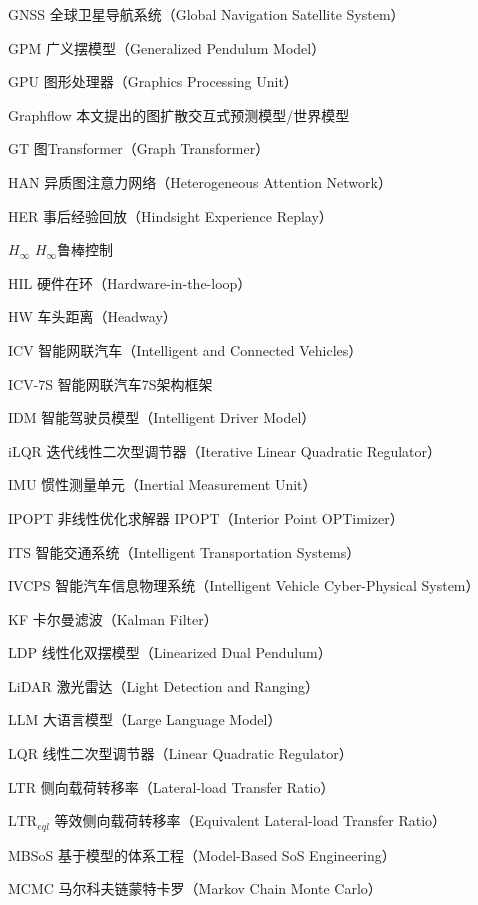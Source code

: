 \begin{denotation}[3cm]
  \item[GNSS] 全球卫星导航系统（Global Navigation Satellite System）
  \item[GPM] 广义摆模型（Generalized Pendulum Model）
  \item[GPU] 图形处理器（Graphics Processing Unit）
  \item[Graphflow] 本文提出的图扩散交互式预测模型/世界模型
  \item[GT] 图Transformer（Graph Transformer）
  \item[HAN] 异质图注意力网络（Heterogeneous Attention Network）
  \item[HER] 事后经验回放（Hindsight Experience Replay）
  \item[{$H_\infty$}] $H_\infty$鲁棒控制
  \item[HIL] 硬件在环（Hardware-in-the-loop）
  \item[HW] 车头距离（Headway）
  \item[ICV] 智能网联汽车（Intelligent and Connected Vehicles）
  \item[ICV-7S] 智能网联汽车7S架构框架
  \item[IDM] 智能驾驶员模型（Intelligent Driver Model）
  \item[iLQR] 迭代线性二次型调节器（Iterative Linear Quadratic Regulator）
  \item[IMU] 惯性测量单元（Inertial Measurement Unit）
  \item[IPOPT] 非线性优化求解器 IPOPT（Interior Point OPTimizer）
  \item[ITS] 智能交通系统（Intelligent Transportation Systems）
  \item[IVCPS] 智能汽车信息物理系统（Intelligent Vehicle Cyber-Physical System）
  \item[KF] 卡尔曼滤波（Kalman Filter）
  \item[LDP] 线性化双摆模型（Linearized Dual Pendulum）
  \item[LiDAR] 激光雷达（Light Detection and Ranging）
  \item[LLM] 大语言模型（Large Language Model）
  \item[LQR] 线性二次型调节器（Linear Quadratic Regulator）
  \item[LTR] 侧向载荷转移率（Lateral-load Transfer Ratio）
  \item[$\text{LTR}_{eql}$] 等效侧向载荷转移率（Equivalent Lateral-load Transfer Ratio）
  \item[MBSoS] 基于模型的体系工程（Model-Based SoS Engineering）
  \item[MCMC] 马尔科夫链蒙特卡罗（Markov Chain Monte Carlo）

\end{denotation}
